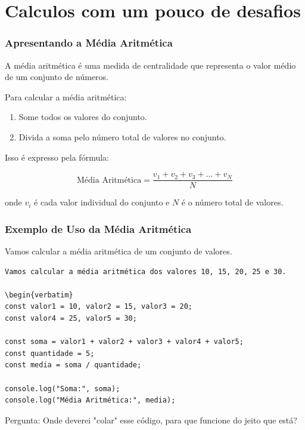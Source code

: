 \documentclass[13pt, xcolor={dvipsnames,svgnames}, portuguese]{beamer}
\begin{document}
\section{Calculos com um pouco de desafios}
\begin{frame}
\frametitle{Apresentando a Média Aritmética}

A média aritmética é uma medida de centralidade que representa o valor médio de um conjunto de números.

\vspace{0.5cm}

Para calcular a média aritmética:

\begin{enumerate}
\item Some todos os valores do conjunto.
\item Divida a soma pelo número total de valores no conjunto.
\end{enumerate}

\vspace{0.5cm}
Isso é expresso pela fórmula:

\[
\text{Média Aritmética} = \frac{v_1 + v_2 + v_3 + \ldots + v_N}{N}
\]

onde $v_i$ é cada valor individual do conjunto e $N$ é o número total de valores.
\end{frame}
\begin{frame}[fragile]
\frametitle{Exemplo de Uso da Média Aritmética}
Vamos calcular a média aritmética de um conjunto de valores.
\begin{verbatim}
Vamos calcular a média aritmética dos valores 10, 15, 20, 25 e 30.

\begin{verbatim}
const valor1 = 10, valor2 = 15, valor3 = 20;
const valor4 = 25, valor5 = 30;

const soma = valor1 + valor2 + valor3 + valor4 + valor5;
const quantidade = 5;
const media = soma / quantidade;

console.log("Soma:", soma);
console.log("Média Aritmética:", media);

\end{verbatim}
Pergunta: Onde deverei "colar" esse código, para que funcione
do jeito que está?
\end{frame}

\end{document}
